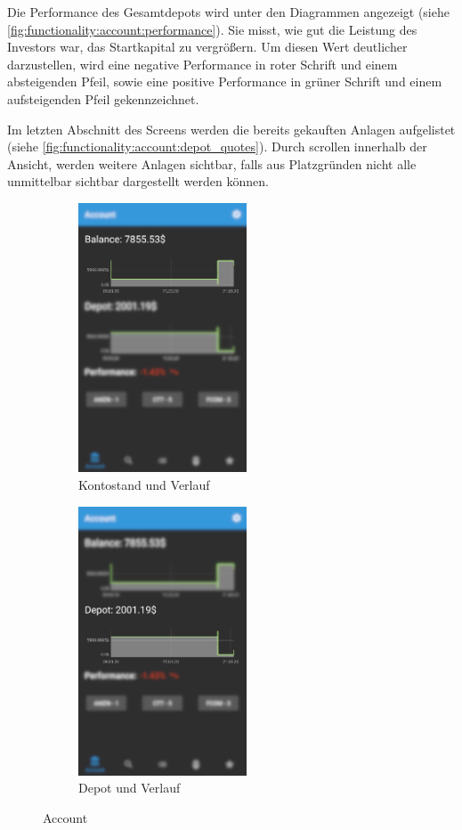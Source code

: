 \documentclass[a4paper]{article}
\begin{document}
Die Performance des Gesamtdepots wird unter den Diagrammen angezeigt (siehe \autoref{fig:functionality:account:performance}). Sie misst, wie gut die Leistung des Investors war, das Startkapital zu vergrößern. Um diesen Wert deutlicher darzustellen, wird eine negative Performance in roter Schrift und einem absteigenden Pfeil, sowie eine positive Performance in grüner Schrift und einem aufsteigenden Pfeil gekennzeichnet.

Im letzten Abschnitt des Screens werden die bereits gekauften Anlagen aufgelistet (siehe \autoref{fig:functionality:account:depot_quotes}). Durch scrollen innerhalb der Ansicht, werden weitere Anlagen sichtbar, falls aus Platzgründen nicht alle unmittelbar sichtbar dargestellt werden können.

\begin{figure}[H]
    \begin{subfigure}{.5\textwidth}
        \centering
        \includegraphics[height=8cm,keepaspectratio]{./images/account/balance.png}
        \caption{Kontostand und Verlauf}
        \label{fig:functionality:account:balance}
    \end{subfigure}
    \begin{subfigure}{.5\textwidth}
        \centering
        \includegraphics[height=8cm,keepaspectratio]{./images/account/depot.png}
        \caption{Depot und Verlauf}
        \label{fig:functionality:account:depot}
    \end{subfigure}
    \caption{Account}
    \label{fig:functionality:account}
\end{figure}
\end{document}
